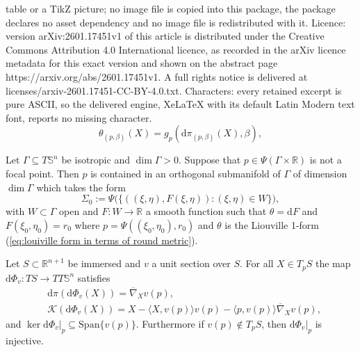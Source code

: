 \documentclass[10pt,a4paper]{amsart}
\def\R{\mathbb{R}}
\def\S{\mathbb{S}}
\newcommand{\td}{\mathrm{d}}
\begin{document}
table or a TikZ picture; no image file is copied into this package, the package declares no asset dependency and no image file is redistributed with it. Licence: version arXiv:2601.17451v1 of this article is distributed under the Creative Commons Attribution 4.0 International licence, as recorded in the arXiv licence metadata for this exact version and shown on the abstract page https://arxiv.org/abs/2601.17451v1. A full rights notice is delivered at licenses/arxiv-2601.17451-CC-BY-4.0.txt. Characters: every retained excerpt is pure ASCII, so the delivered engine, XeLaTeX with its default Latin Modern text font, reports no missing character.
\begin{equation}\label{eq:louiville form in terms of round metric}
    \theta_{(p,\beta)}(X)=g_p(\td \pi_{(p,\beta)}(X),\beta),
  \end{equation}

 \begin{Prop} \label{prop: isotropic implies existance of orthogonal sub manifolds}
Let $\Gamma\subseteq T\mathbb{S}^n$ be isotropic and $\dim \Gamma>0$. Suppose that $p\in\Psi(\Gamma\times\mathbb{R})$ is not a focal point. Then $p$ is contained in an orthogonal submanifold of $\Gamma$ of dimension $\dim \Gamma$ which takes the form
\[
\Sigma_0:=\Psi\Big(\Big\{((\xi,\eta),F(\xi,\eta)): (\xi,\eta)\in W\Big\}\Big),
\]
with $W\subset \Gamma$ open and $F:W\to \mathbb{R}$ a smooth function such that $\theta=\td F$ and $F(\xi_0,\eta_0)=r_0$ where $p=\Psi((\xi_0,\eta_0),r_0)$ and $\theta$ is the Liouville 1-form (\ref{eq:louiville form in terms of round metric}).
\end{Prop}

\begin{Lem}\label{Lem: derivative of Phi_v}
    Let $S\subset \R^{n+1}$ be immersed and $v$ a unit section over $S$. For all $X\in T_pS$ the map $\td\Phi_v:TS\to TT\S^n$ satisfies
    \begin{equation}\label{eq: derivative of Phi_v}
    \begin{aligned}
        &\td\pi(\td\Phi_v(X))=\overline\nabla_Xv(p),\\ &\mathcal{K}(\td\Phi_v(X))=X-\langle X,v(p)\rangle v(p)-\langle p, v(p)\rangle \overline\nabla_X v(p),
    \end{aligned}
    \end{equation}
    and $\ker \td\Phi_v|_p \subseteq \mbox{Span}\{v(p)\}$. Furthermore if $v(p)\notin T_pS$, then $\td\Phi_v|_p$ is injective.
\end{Lem}
\end{document}
